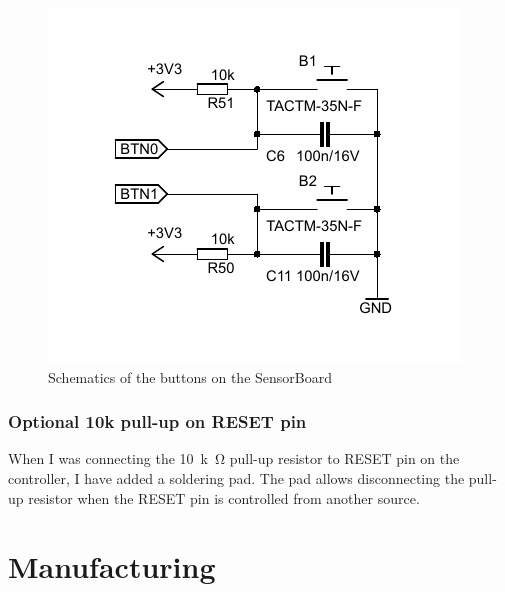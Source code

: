 \begin{figure}
    \centering
    \caption{Schematics of the buttons on the SensorBoard}
    \label{fig:schButton}
    \includegraphics[scale=1.3]{img/SchButtons.pdf}
\end{figure}

\subsubsection{Optional 10k pull-up on RESET pin}
When I was connecting the \SI{10}{k\ohm} pull-up resistor to RESET pin on the controller, I have added a soldering pad. The pad allows disconnecting the pull-up resistor when the RESET pin is controlled from another source.

\section{Manufacturing}
\label{HWmanufacturing}

